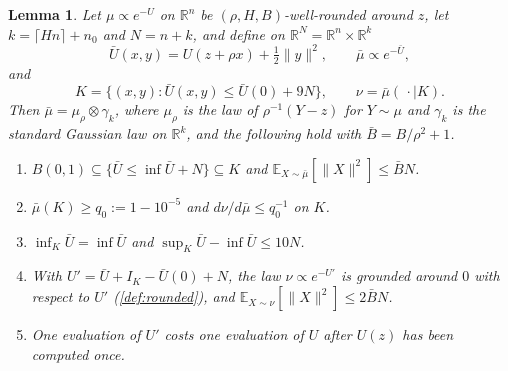\documentclass[11pt]{article}
\numberwithin{equation}{section}
\newtheorem{lemma}{Lemma}[section]
\theoremstyle{definition}
\newcommand{\R}{\mathbb{R}}
\newcommand{\E}[2]{\mathbb{E}_{#1}\left[#2\right]}
\begin{document}
\begin{lemma}
\label{lem:restriction}
Let $\mu\propto e^{-U}$ on
$\R^n$ be
$(\rho,H,B)$-well-rounded around
$z$, let
$k=\lceil Hn\rceil+n_0$ and
$N=n+k$, and define on
$\R^N=\R^n\times\R^k$
\[
 \bar U(x,y)=U(z+\rho x)+\tfrac12\|y\|^2,
 \qquad
 \bar\mu\propto e^{-\bar U},
\]
and
\[
 K=\{(x,y):\bar U(x,y)\leq\bar U(0)+9N\},
 \qquad
 \nu=\bar\mu(\,\cdot\mid K).
\]
Then $\bar\mu=\mu_\rho\otimes\gamma_k$, where
$\mu_\rho$ is the law of
$\rho^{-1}(Y-z)$ for
$Y\sim\mu$ and
$\gamma_k$ is the standard Gaussian law on
$\R^k$, and the following hold with
$\bar B=B/\rho^2+1$.
\begin{enumerate}
\item \label{itm:restriction:1} $B(0,1)\subseteq\{\bar U\leq\inf\bar U+N\}\subseteq K$ and
  $\E{X\sim\bar\mu}{\|X\|^2}\leq\bar BN$.
\item \label{itm:restriction:2} $\bar\mu(K)\geq q_0:=1-10^{-5}$ and
  $d\nu/d\bar\mu\leq q_0^{-1}$ on
  $K$.
\item \label{itm:restriction:3} $\inf_K\bar U=\inf\bar U$ and
  $\sup_K\bar U-\inf\bar U\leq10N$.
\item \label{itm:restriction:4} With $U'=\bar U+I_K-\bar U(0)+N$, the law
  $\nu\propto e^{-U'}$ is grounded around
  $0$ with respect to
  $U'$ (\cref{def:rounded}), and
  $\E{X\sim\nu}{\|X\|^2}\leq2\bar BN$.
\item \label{itm:restriction:5} One evaluation of
  $U'$ costs one evaluation of
  $U$ after
  $U(z)$ has been computed once.
\end{enumerate}
\end{lemma}
\end{document}

